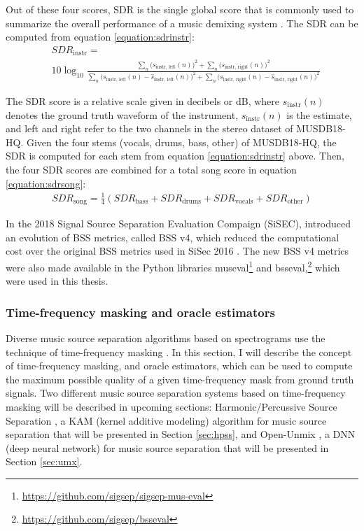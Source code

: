 \documentclass[report.tex]{subfiles}
\begin{document}
Out of these four scores, SDR is the single global score that is commonly used to summarize the overall performance of a music demixing system \parencite{sdruseful}. The SDR can be computed from equation \eqref{equation:sdrinstr}:
\begin{align}
	\nonumber & \mathit{SDR}_{\text{instr}} = \\
	&10 \log_{10}\frac{\sum_{n}\big(s_{\text{instr, left}}(n)\big)^{2} + \sum_{n}\big(s_{\text{instr, right}}(n)\big)^{2}}{\sum_{n}\big(s_{\text{instr, left}}(n) - \hat{s}_{\text{instr, left}}(n)\big)^{2} + \sum_{n}\big(s_{\text{instr, right}}(n) - \hat{s}_{\text{instr, right}}(n)\big)^{2}} \tag{18}\label{equation:sdrinstr}
\end{align}

The SDR score is a relative scale given in decibels or dB, where $s_{\text{instr}}(n)$ denotes the ground truth waveform of the instrument, $\hat{s}_{\text{instr}}(n)$ is the estimate, and left and right refer to the two channels in the stereo dataset of MUSDB18-HQ. Given the four stems (vocals, drums, bass, other) of MUSDB18-HQ, the SDR is computed for each stem from equation \eqref{equation:sdrinstr} above. Then, the four SDR scores are combined for a total song score in equation \eqref{equation:sdrsong}:
\begin{align}
	\mathit{SDR}_{\text{song}} = \frac{1}{4}(\mathit{SDR}_{\text{bass}} + \mathit{SDR}_{\text{drums}} + \mathit{SDR}_{\text{vocals}} + \mathit{SDR}_{\text{other}}) \tag{19}\label{equation:sdrsong}
\end{align}

In the 2018 Signal Source Separation Evaluation Compaign (SiSEC), \textcite{sisec2018} introduced an evolution of BSS metrics, called BSS v4, which reduced the computational cost over the original BSS metrics used in SiSec 2016 \parencite{sisec2016}. The new BSS v4 metrics were also made available in the Python libraries museval\footnote{\url{https://github.com/sigsep/sigsep-mus-eval}} and bsseval,\footnote{\url{https://github.com/sigsep/bsseval}} which were used in this thesis.

\subsubsection{Time-frequency masking and oracle estimators}
\label{sec:masksandoracles}

Diverse music source separation algorithms based on spectrograms use the technique of time-frequency masking \parencite{musicsepgood, musicmask}. In this section, I will describe the concept of time-frequency masking, and oracle estimators, which can be used to compute the maximum possible quality of a given time-frequency mask from ground truth signals. Two different music source separation systems based on time-frequency masking will be described in upcoming sections: Harmonic/Percussive Source Separation \parencite{fitzgerald1}, a KAM (kernel additive modeling) algorithm for music source separation that will be presented in Section \ref{sec:hpss}, and Open-Unmix \parencite{umx}, a DNN (deep neural network) for music source separation that will be presented in Section \ref{sec:umx}.
\end{document}
